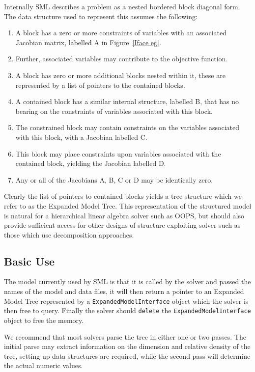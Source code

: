 \documentclass[10pt,a4paper]{book}
\begin{document}
\begin{verbtaim}
Internally  SML describes a problem as a nested bordered block diagonal form.
The data structure used to represent this assumes the following:
\begin{enumerate}
   \item A block has a zero or more constraints of variables with an associated
      Jacobian matrix, labelled A in Figure~\ref{Iface eg}.
   \item Further, associated variables may contribute to the objective function.
   \item A block has zero or more additional blocks nested within it, these are
      represented by a list of pointers to the contained blocks.
   \item A contained block has a similar internal structure, labelled B, that
      has no bearing on the constraints of variables associated with this block.
   \item The constrained block may contain constraints on the variables
      associated with this block, with a Jacobian labelled C.
   \item This block may place constraints upon variables associated with
      the contained block, yielding the Jacobian labelled D.
   \item Any or all of the Jacobians A, B, C or D may be identically zero.
\end{enumerate}

Clearly the list of pointers to contained blocks yields a tree structure which
we refer to as the Expanded Model Tree.  This representation of the structured
model is natural for a hierarchical linear algebra solver such as OOPS, but
should also provide sufficient access for other designs of structure exploiting
solver such as those which use decomposition approaches.

\subsection{Basic Use}

The model currently used by SML is that it is called by the solver and passed
the names of the model and data files, it will then return a pointer to an
Expanded Model Tree represented by a {\tt ExpandedModelInterface} object which
the solver is then free to query. Finally the solver should {\tt delete} the
{\tt ExpandedModelInterface} object to free the memory.

We recommend that most solvers parse the tree in either one or two passes. The
initial parse may extract information on the dimension and relative density of
the tree, setting up data structures are required, while the second pass will
determine the actual numeric values.


\end{verbtaim}
\end{document}
